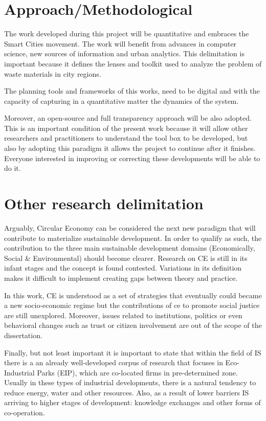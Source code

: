 \section{Approach/Methodological}
The work developed during this project will be quantitative and embraces the Smart Cities movement. The work will benefit from advances in computer science, new sources of information and urban analytics. This delimitation is important because it defines the lenses and toolkit used to analyze the problem of waste materials in city regions. \par
The planning tools and frameworks of this works, need to be digital and with the capacity of capturing in a quantitative matter the dynamics of the system.\par
Moreover, an open-source and full transparency approach will be also adopted. This is an important condition of the present work because it will allow other researchers and practitioners to understand the tool box to be developed, but also by adopting this paradigm it allows the project to continue after it finishes. Everyone interested in improving or correcting these developments will be able to do it.  


\section{Other research delimitation}
Arguably, Circular Economy can be considered the next new paradigm that will contribute to materialize sustainable development. In order to qualify as such, the contribution to the three main sustainable development domains (Economically, Social \& Environmental) should become clearer. %
Research on CE is still in its infant stages and the concept is found contested.  %
Variations in its definition makes it difficult to implement creating gaps between theory and practice. \par %

In this work, CE is understood as a set of strategies that eventually could became a new socio-economic regime but the contributions of ce to promote social justice are still unexplored. Moreover, issues related to institutions, politics or even behavioral changes such as trust or citizen involvement are out of the scope of the dissertation.\par
Finally, but not least important it is important to state that within the field of IS there is a an already well-developed corpus of research that focuses in Eco-Industrial Parks (EIP), which are co-located firms in pre-determined zone. Usually in these types of industrial developments, there is a natural tendency to reduce energy, water and other resources. Also, as a result of lower barriers IS arriving to higher stages of development: knowledge exchanges and other forms of co-operation. \par



